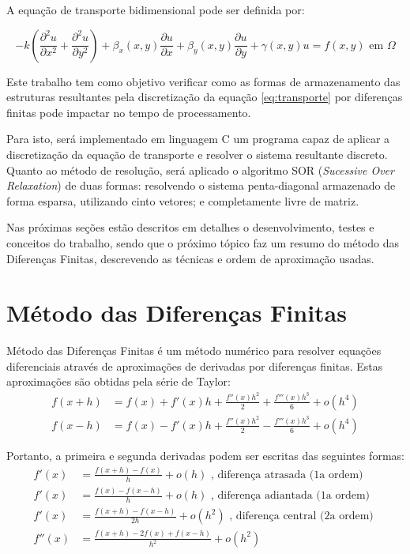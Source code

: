 \documentclass[
	11pt,				%
	oneside,			%
	a4paper,			%
	english,			%
	brazil,				%
	]{article}
\begin{document}
A equação de transporte bidimensional pode ser definida por:

\begin{equation} \label{eq:transporte}
- k \left(\frac{\partial^2 u}{\partial x^2} + \frac{\partial^2 u}{\partial 
y^2}\right) +
\beta_x(x,y)\frac{\partial u}{\partial x} +
\beta_y(x,y)\frac{\partial u}{\partial y} +
\gamma(x,y)u = f(x,y) \text{ em } \Omega
\end{equation}

Este trabalho tem como objetivo verificar como as formas de armazenamento das 
estruturas resultantes pela discretização da equação \eqref{eq:transporte} por 
diferenças finitas pode impactar no tempo de processamento.

Para isto, será implementado em linguagem C um programa capaz de aplicar a 
discretização da equação de transporte e resolver o sistema resultante 
discreto. Quanto ao método de resolução, será aplicado o algoritmo SOR
(\textit{Sucessive Over Relaxation}) de duas formas: resolvendo o sistema 
penta-diagonal armazenado de forma esparsa, utilizando  cinto vetores; e 
completamente livre de matriz.

Nas próximas seções estão descritos em detalhes o desenvolvimento, testes e 
conceitos do trabalho, sendo que o próximo tópico faz um resumo do método das 
Diferenças Finitas, descrevendo as técnicas e ordem de aproximação usadas.

\section{Método das Diferenças Finitas}
Método das Diferenças Finitas é um método numérico para resolver equações 
diferenciais através de aproximações de derivadas por diferenças finitas. Estas 
aproximações são obtidas pela série de Taylor:
\begin{align*}
f(x+h) &= f(x)+f'(x)h + \frac{f''(x)h^2}{2} + \frac{f'''(x)h^3}{6} + o(h^4) \\ 
f(x-h) &= f(x) - f'(x)h + \frac{f''(x)h^2}{2} - \frac{f'''(x)h^3}{6} + 
o(h^4)
\end{align*}

Portanto, a primeira e segunda derivadas podem ser escritas das
seguintes formas:
\begin{align*}
f'(x) &= \frac{f(x+h)-f(x)}{h}+o(h) \text{ , diferença atrasada
(1a ordem) }  \\
f'(x) &= \frac{f(x) - f(x-h)}{h} + o(h) \text{ , diferença adiantada
(1a ordem) } \\
f'(x) &= \frac{f(x+h) - f(x-h)}{2h} + o(h^2) \text{ , diferença central 
(2a ordem) } \\
f''(x) &= \frac{f(x+h) -2f(x) + f(x-h)}{h^2} + o(h^2)
\end{align*}
\end{document}
